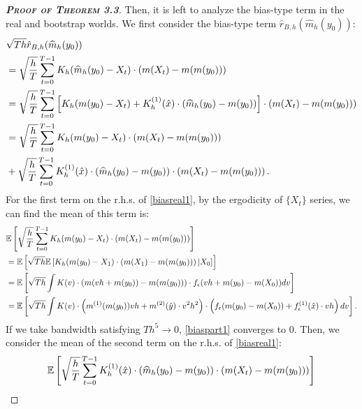 \documentclass[a4paper]{article}
\begin{document}
\begin{proof}[\textbf{\textsc{Proof of Theorem 3.3}}]
Then, it is left to analyze the bias-type term in the real and bootstrap worlds. We first consider the bias-type term $\hat{r}_{B,h}(\widehat{m}_{h}(y_0))$:
\begin{equation}\label{biasreal1}
\begin{split}
    &\sqrt{Th}\hat{r}_{B,h}(\widehat{m}_h(y_0)) \\
    &= \sqrt{\frac{h}{T}}\sum_{t=0}^{T-1}K_h(\widehat{m}_h(y_0)-X_t)\cdot\left(m(X_t) -  m(m(y_0))    \right)\\
    &= \sqrt{\frac{h}{T}}\sum_{t=0}^{T-1}\left[ K_h(m(y_0)- X_t) +K^{(1)}_h(\Hat{x})\cdot (\widehat{m}_{h}(y_0) - m(y_0)) \right]\cdot\left(m(X_t) -  m(m(y_0))    \right)\\
    & =   \sqrt{\frac{h}{T}}\sum_{t=0}^{T-1}K_h(m(y_0)- X_t)\cdot\left(m(X_t) -  m(m(y_0))    \right)    \\
    & + \sqrt{\frac{h}{T}}\sum_{t=0}^{T-1}K^{(1)}_h(\Hat{x})\cdot (\widehat{m}_{h}(y_0) - m(y_0)) \cdot\left(m(X_t) -  m(m(y_0))    \right).   \\
\end{split}
\end{equation}
For the first term on the r.h.s. of \cref{biasreal1}, by the ergodicity of $\{X_t\}$ series, we can find the mean of this term is:
\begin{equation}\label{biaspart1}
\begin{split}
    &\mathbb{E}\left[\sqrt{\frac{h}{T}}\sum_{t=0}^{T-1}K_h(m(y_0)- X_t)\cdot\left(m(X_t) -  m(m(y_0))    \right) \right]\\
    &=\mathbb{E}\left[\sqrt{Th}\mathbb{E}\left[ K_h(m(y_0)- X_1)\cdot\left(m(X_1) -  m(m(y_0))    \right) |X_0    \right] \right]\\
    & = \mathbb{E}\left[\sqrt{Th}\int K(v) \cdot\left(m(vh + m(y_0)) -  m(m(y_0))    \right) \cdot f_{\epsilon}(vh + m(y_0) - m(X_0)) dv\right]  \\
    & = \mathbb{E}\left[\sqrt{Th}\int K(v) \cdot\left(m^{(1)}(m(y_0))vh + m^{(2)}(\Hat{y})\cdot v^2h^2  \right) \cdot \left( f_{\epsilon}(m(y_0)-m(X_0)) + f^{(1)}_{\epsilon}(\Hat{x})\cdot vh  \right) dv \right].
\end{split}  
\end{equation}
If we take bandwidth satisfying $Th^5 \to 0$, \cref{biaspart1} converges to 0. Then, we consider the mean of the second term on the r.h.s. of \cref{biasreal1}:
\begin{equation} \label{biaspart2}
\begin{split}
    & \mathbb{E}\left[\sqrt{\frac{h}{T}}\sum_{t=0}^{T-1}K^{(1)}_h(\Hat{x})\cdot (\widehat{m}_{h}(y_0) - m(y_0)) \cdot\left(m(X_t) -  m(m(y_0))    \right)  \right] \\

\end{split}
\end{equation}
\end{proof}
\end{document}
